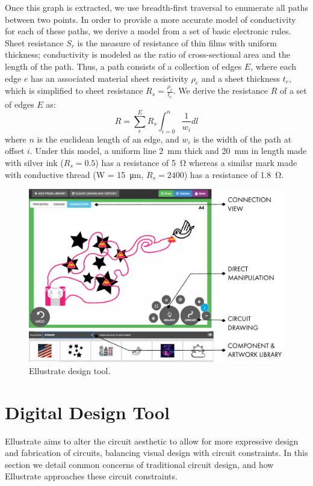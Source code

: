 \documentclass{sigchi}
\begin{document}
      
      Once this graph is extracted, we use breadth-first traversal to enumerate all paths between two points. In order to provide a more accurate model of conductivity for each of these paths, we derive a model from a set of basic electronic rules. Sheet resistance $S_r$ is the measure of resistance of thin films with uniform thickness; conductivity is modeled as the ratio of cross-sectional area and the length of the path. Thus, a path consists of a collection of edges $E$, where each edge $e$ has an associated material sheet resistivity $\rho_e$ and a sheet thickness $t_e$, which is simplified to sheet resistance $R_s = \frac{\rho_e}{t_e}$. We derive the resistance $R$ of a set of edges $E$ as:
        \begin{equation}
            R =  \sum^{E}_e R_s \int_{i=0}^{n}  \frac{1}{w_i} dl
        \label{eq:resistance}
        \end{equation}
      where $n$ is the euclidean length of an edge, and $w_i$ is the width of the path at offset $i$. Under this model, a uniform line \SI{2}{\milli\metre} thick and \SI{20}{\milli\metre} in length made with silver ink ($R_s = 0.5$) has a resistance of \SI{5}{\ohm} whereas a similar mark made with conductive thread (W = \SI{15}{\micro\metre}, $R_s = 2400$) has a resistance of \SI{1.8}{\ohm}.

    \begin{figure}[t]
    \centering
    \includegraphics[width=1.0\columnwidth]{figures/designtool.pdf}
    \caption{Ellustrate design tool. }
    \label{fig:design_tool}
    \vspace{-16pt}
    \end{figure}
    
\section{Digital Design Tool}
    Ellustrate aims to alter the circuit aesthetic to allow for more expressive design and fabrication of circuits, balancing visual design with circuit constraints. In this section we detail common concerns of traditional circuit design, and how Ellustrate approaches these circuit constraints.
\end{document}
